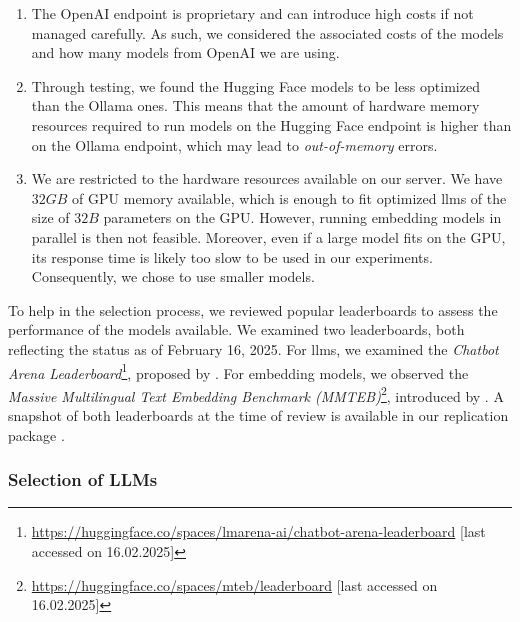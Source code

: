 \begin{enumerate}
    \item The OpenAI endpoint is proprietary and can introduce high costs if not managed carefully. As such, we considered the associated costs of the models and how many models from OpenAI we are using.
    \item Through testing, we found the Hugging Face models to be less optimized than the Ollama ones. This means that the amount of hardware memory resources required to run models on the Hugging Face endpoint is higher than on the Ollama endpoint, which may lead to \emph{out-of-memory} errors.
    \item We are restricted to the hardware resources available on our server. We have $32 GB$ of GPU memory available, which is enough to fit optimized \glspl{llm} of the size of $32B$ parameters on the GPU. However, running embedding models in parallel is then not feasible. Moreover, even if a large model fits on the GPU, its response time is likely too slow to be used in our experiments. Consequently, we chose to use smaller models. 
\end{enumerate}

To help in the selection process, we reviewed popular leaderboards to assess the performance of the models available. We examined two leaderboards, both reflecting the status as of February 16, 2025. For \glspl{llm}, we examined the \emph{Chatbot Arena Leaderboard}\footnote{\url{https://huggingface.co/spaces/lmarena-ai/chatbot-arena-leaderboard} [last accessed on 16.02.2025]}, proposed by \textcite{chiang_chatbot_2024}. For embedding models, we observed the \emph{Massive Multilingual Text Embedding Benchmark (MMTEB)}\footnote{\url{https://huggingface.co/spaces/mteb/leaderboard} [last accessed on 16.02.2025]}, introduced by \textcite{enevoldsen_mmteb_2025}. A snapshot of both leaderboards at the time of review is available in our replication package \cite{schneider_replication_2025}.

\subsubsection{Selection of LLMs}

